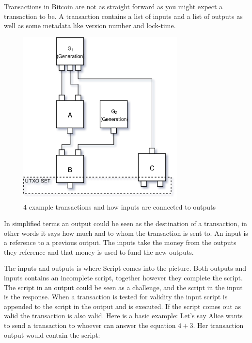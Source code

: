 \label{transactions}
Transactions in Bitcoin are not as straight forward as you might expect a transaction to be. A transaction contains a list of inputs and a list of outputs as well as some metadata like version number and lock-time. 

\begin{figure}[H]
	\centering
	\includegraphics[width=0.75\textwidth]{background/images/transaction_diagram.png}
	\caption{4 example transactions and how inputs are connected to outputs}
	\label{fig:transaction_input_output}
\end{figure}

In simplified terms an output could be seen as the destination of a transaction, in other words it says how much and to whom the transaction is sent to. An input is a reference to a previous output. The inputs take the money from the outputs they reference and that money is used to fund the new outputs. 

The inputs and outputs is where Script comes into the picture. Both outputs and inputs contains an incomplete script, together however they complete the script. The script in an output could be seen as a challenge, and the script in the input is the response. When a transaction is tested for validity the input script is appended to the script in the output and is executed. If the script comes out as valid the transaction is also valid. Here is a basic example: Let's say Alice wants to send a transaction to whoever can answer the equation $4+3$. Her transaction output would contain the script:

